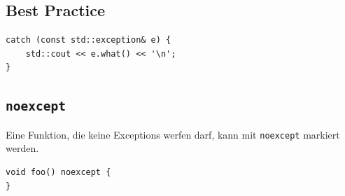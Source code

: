 \documentclass[11pt,a4paper]{article}
\newcommand{\code}[1]{\texttt{#1}}
\begin{document}
\subsection{Best Practice}
\begin{lstlisting}[caption={Allgemeiner catch-Block}]
catch (const std::exception& e) {
    std::cout << e.what() << '\n';
}
\end{lstlisting}

\subsection{\code{noexcept}}
Eine Funktion, die keine Exceptions werfen darf, kann mit \code{noexcept} markiert werden.

\begin{lstlisting}[caption={noexcept-Funktion}]
void foo() noexcept {
}
\end{lstlisting}
\end{document}
